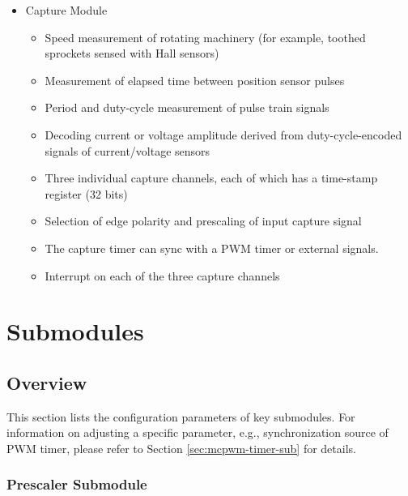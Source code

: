 \documentclass[main\_\_EN.tex]{subfiles}
\begin{document}
\begin{itemize}
        \begin{itemize}
            \item Programmable fault handling allocated on fault condition in both cycle-by-cycle mode and one-shot mode.
            \item A fault condition can force the PWM output to either high or low logic levels.
        \end{itemize}
    \item Capture Module
        \begin{itemize}
            \item Speed measurement of rotating machinery (for example, toothed sprockets sensed with Hall sensors)
            \item Measurement of elapsed time between position sensor pulses
            \item Period and duty-cycle measurement of pulse train signals
            \item Decoding current or voltage amplitude derived from duty-cycle-encoded signals of current/voltage sensors
            \item Three individual capture channels, each of which has a time-stamp register (32 bits)
            \item Selection of edge polarity and prescaling of input capture signal
            \item The capture timer can sync with a PWM timer or external signals.
            \item Interrupt on each of the three capture channels
        \end{itemize}
\end{itemize}
\clearpage

\section{Submodules}
\subsection{Overview}

This section lists the configuration parameters of key submodules. For information on adjusting a specific parameter, e.g., synchronization source of PWM timer, please refer to Section \ref{sec:mcpwm-timer-sub} for details.

\subsubsection{Prescaler Submodule}
\end{document}

